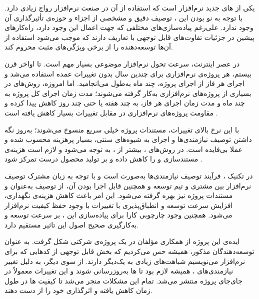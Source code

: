     یکی
از ‌های جدید  نرم‌افزار است که استفاده از آن در صنعت
نرم‌افزار رواج زیادی دارد. با توجه به نو بودن این ،
توصیف دقیق و مشخصی از اجزاء و حوزه‌ی تأثیرگذاری آن وجود ندارد. علی‌رغم
پیاده‌سازی‌های مختلفی که جهت اعمال این  وجود دارد،
راه‌کارهای پیشین در جزئیات تفاوت‌های قابل توجهی با تعاریف
 دارند که موجب می‌شود استفاده از آن‌ها توسعه‌دهنده را از
برخی ویژگی‌های مثبت  محروم کند.

در عصر اینترنت، سرعت تحول نرم‌افزار موضوعی بسیار مهم است. تا اواخر قرن
بیستم، هر پروژه‌ی نرم‌افزاری برای چندین سال بدون تغییرات عمده استفاده
می‌شد و اجرای هر فاز از اجرای پروژه، چند ماه به‌طول می‌انجامید. اما
امروزه، روش‌های  در بسیاری از پروژه‌های نرم‌افزاری به‌کار
گرفته می‌شوند؛ مدت زمان اجرای کل پروژه به چند ماه و مدت زمان اجرای هر
فاز، به چند هفته یا حتی چند روز کاهش پیدا کرده و مقاومت پروژه‌های
نرم‌افزاری در مقابل تغییرات بسیار کاهش یافته است .

با این نرخ بالای تغییرات، مستندات پروژه خیلی سریع منسوخ می‌شوند؛ به‌روز
نگه داشتن توصیف نیازمندی‌ها و اجرای  به شیوه‌های سنتی، بسیار
پرهزینه محسوب شده و عملا بی‌فایده است. در روش‌های ،
بیشتر از ، به
 توجه می‌شود و لازم
است هزینه‌ی مستندسازی و  را کاهش داده و بر تولید محصول درست
تمرکز شود .

در تکنیک ، فرآیند توصیف نیازمندی‌ها به‌صورت
 است و با توجه به زبان مشترک توصیف نرم‌افزار بین مشتری و
تیم توسعه و همچنین قابل اجرا بودن آن، از توصیف به‌عنوان  و
مستندات پروژه نیز بهره گرفته می‌شود. این امر باعث کاهش هزینه‌ی نگهداری،
افزایش سرعت توسعه  و انطباق‌پذیری با تغییرات با وجود حفظ
کیفیت نرم‌افزار می‌شود. همچنین وجود چارچوبی کارا برای پیاده‌سازی این
، بر سرعت توسعه و به‌کارگیری صحیح اصول این 
تاثیر مستقیم دارد.

ایده‌ی این پروژه از همکاری مؤلفان در یک پروژه‌ی شرکتی شکل گرفت. به عنوان توسعه‌دهندگان  مذکور، همیشه حس می‌کردیم که بخش قابل توجهی از کدهایی که برای  نرم‌افزار می‌نویسیم شباهت‌های زیادی به یک‌دیگر دارند.
از سوی دیگر، به دلیل تغییر نیازمندی‌های ، همیشه لازم بود تا ‌ها به‌روزرسانی شوند و این تغییرات معمولاً در جای‌جای پروژه منتشر می‌شد. تمام این مشکلات منجر می‌شد تا کیفیت ‌ها در طول زمان کاهش یافته و اثرگذاری خود را از دست دهند.

